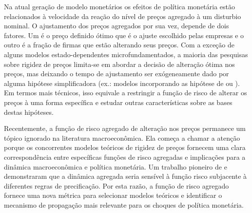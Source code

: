 \documentclass[twoside,a4paper,11pt]{report}
\begin{document}
Na atual geração de modelo monetários os efeitos de política monetária estão relacionados à velocidade da reação do nível de preços agregado à um disturbio nominal. O ajustamento dos preços agregados por sua vez, depende de dois fatores. Um é o preço definido ótimo que é o ajuste escolhido pelas empresas e o outro é a fração de firmas que estão alterando seus preços. Com a exceção de alguns modelos estado-dependentes microfundamentados, a maioria das pesquisas sobre rigidez de preços limita-se em abordar a decisão de alteração ótima nos preços, mas deixando o tempo de ajustamento ser exógeneamente dado por alguma hipótese simplificadora (ex.: modelos incorporando as hipótese de \citet{taylor1980aggregate} ou \citet{calvo1983staggered}). Em termos mais técnicos, isso equivale a restringir a função de risco de alterar os preços à uma forma específica e estudar outras características sobre as bases destas hipóteses. 

Recentemente, a função de risco agregado de alteração nos preços permanece um tópico ignorado na literatura macroeconômica. Ela começa a chamar a atenção porque os concorrentes modelos teóricos de rigidez de preços fornecem uma clara correspondência entre específicas funções de risco agregadas e implicações para a dinâmica macroeconômica e política monetária. Um trabalho pioneiro de \citet{wolman1999sticky} e \citet{kiley2002partial} demonstraram que a dinâmica agregada seria sensível à função risco subjacente à diferentes regras de precificação. Por esta razão, a função de risco agregado fornece uma nova métrica para selecionar modelos teóricos e identificar o mecanismo de propagação mais relevante para os choques de política monetária. 
\end{document}

